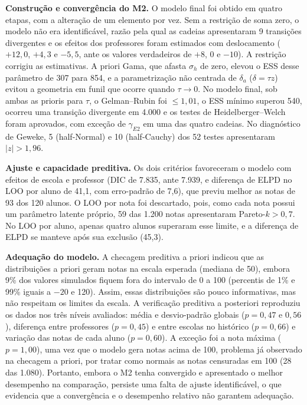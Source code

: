 \documentclass[12pt,a4paper]{article}
\begin{document}
\textbf{Construção e convergência do M2.} O modelo final foi obtido em quatro etapas, com a
alteração de um elemento por vez. Sem a restrição de soma zero, o modelo não era
identificável, razão pela qual as cadeias apresentaram 9 transições divergentes e os efeitos
dos professores foram estimados com deslocamento ($+12{,}0$, $+4{,}3$ e $-5{,}5$, ante os
valores verdadeiros de $+8$, 0 e $-10$). A restrição corrigiu as estimativas. A priori Gama,
que afasta $\sigma_h$ de zero, elevou o ESS desse parâmetro de 307 para 854, e a
parametrização não centrada de $\delta_a$ ($\delta = \tau z$) evitou a geometria em funil que
ocorre quando $\tau \to 0$. No modelo final, sob ambas as prioris para $\tau$, o Gelman--Rubin
foi $\le 1{,}01$, o ESS mínimo superou 540, ocorreu uma transição divergente em 4.000 e os
testes de Heidelberger--Welch foram aprovados, com exceção de $\gamma_{E2}$ em uma das quatro
cadeias. No diagnóstico de Geweke, 5 (half-Normal) e 10 (half-Cauchy) dos 52 testes
apresentaram $|z| > 1{,}96$.

\textbf{Ajuste e capacidade preditiva.} Os dois critérios favoreceram o modelo com efeitos de
escola e professor (DIC de 7.835, ante 7.939, e diferença de ELPD no LOO por aluno de 41,1, com
erro-padrão de 7,6), que previu melhor as notas de 93 dos 120 alunos. O LOO por nota foi
descartado, pois, como cada nota possui um parâmetro latente próprio, 59 das 1.200 notas
apresentaram Pareto-$k > 0{,}7$. No LOO por aluno, apenas quatro alunos superaram esse limite,
e a diferença de ELPD se manteve após sua exclusão (45,3).

\textbf{Adequação do modelo.} A checagem preditiva a priori indicou que as distribuições a
priori geram notas na escala esperada (mediana de 50), embora 9\% dos valores simulados fiquem
fora do intervalo de 0 a 100 (percentis de 1\% e 99\% iguais a $-20$ e 120). Assim, essas
distribuições são pouco informativas, mas não respeitam os limites da escala. A verificação
preditiva a posteriori reproduziu os dados nos três níveis avaliados: média e desvio-padrão
globais ($p = 0{,}47$ e $0{,}56$), diferença entre professores ($p = 0{,}45$) e entre escolas
no histórico ($p = 0{,}66$) e variação das notas de cada aluno ($p = 0{,}60$). A exceção foi a
nota máxima ($p = 1{,}00$), uma vez que o modelo gera notas acima de 100, problema já observado
na checagem a priori, por tratar como normais as notas censuradas em 100 (28 das 1.080).
Portanto, embora o M2 tenha convergido e apresentado o melhor desempenho na comparação,
persiste uma falta de ajuste identificável, o que evidencia que a convergência e o desempenho
relativo não garantem adequação.
\end{document}
